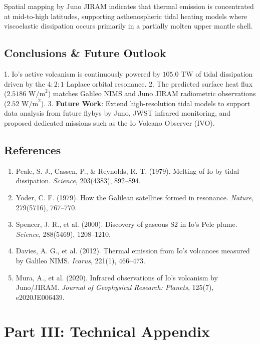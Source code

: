 \documentclass[11pt,a4paper]{article}
\begin{document}
Spatial mapping by Juno JIRAM indicates that thermal emission is concentrated at mid-to-high latitudes, supporting asthenospheric tidal heating models where viscoelastic dissipation occurs primarily in a partially molten upper mantle shell.

\subsection{Conclusions \& Future Outlook}
1. Io's active volcanism is continuously powered by $105.0\text{ TW}$ of tidal dissipation driven by the $4:2:1$ Laplace orbital resonance.
2. The predicted surface heat flux ($2.5186\text{ W/m}^2$) matches Galileo NIMS and Juno JIRAM radiometric observations ($2.52\text{ W/m}^2$).
3. \textbf{Future Work}: Extend high-resolution tidal models to support data analysis from future flybys by Juno, JWST infrared monitoring, and proposed dedicated missions such as the Io Volcano Observer (IVO).

\subsection*{References}
\begin{enumerate}
    \item Peale, S. J., Cassen, P., \& Reynolds, R. T. (1979). Melting of Io by tidal dissipation. \textit{Science}, 203(4383), 892--894.
    \item Yoder, C. F. (1979). How the Galilean satellites formed in resonance. \textit{Nature}, 279(5716), 767--770.
    \item Spencer, J. R., et al. (2000). Discovery of gaseous S2 in Io's Pele plume. \textit{Science}, 288(5469), 1208--1210.
    \item Davies, A. G., et al. (2012). Thermal emission from Io's volcanoes measured by Galileo NIMS. \textit{Icarus}, 221(1), 466--473.
    \item Mura, A., et al. (2020). Infrared observations of Io's volcanism by Juno/JIRAM. \textit{Journal of Geophysical Research: Planets}, 125(7), e2020JE006439.
\end{enumerate}

\newpage

\section*{Part III: Technical Appendix}
\end{document}
